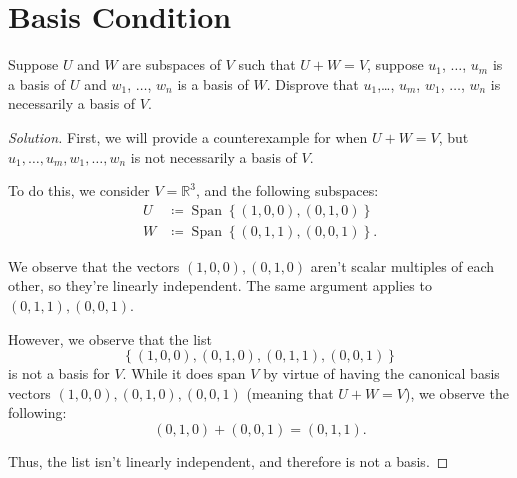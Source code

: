 \documentclass{article}
\newenvironment{solution}{\begin{proof}[Solution]}{\end{proof}}
\newcommand{\RR}{\mathbb{R}}
\DeclareMathOperator*{\Span}{Span}
\begin{document}
	\section{Basis Condition}
	\begin{hw}
		Suppose $U$ and $W$ are subspaces of $V$ such that $U+W=V$, suppose $u_1$, $\ldots$, $u_m$ is a basis of $U$ and $w_1$, $\ldots$, $w_n$ is a basis  of $W$. Disprove that $u_1$,\ldots, $u_m$, $w_1$, $\ldots$, $w_n$ is necessarily a basis of $V$.
	\end{hw}
	\begin{solution}
		First, we will provide a counterexample for when $U + W = V$, but $u_{1}, \ldots, u_{m}, w_{1}, \ldots, w_{n}$ is not necessarily a basis of $V$.
		
		To do this, we consider $V = \RR^{3}$, and the following subspaces:
		\begin{align*}
			U &\coloneq \Span\left\{  (1,0,0), (0,1,0) \right\} \\
			W &\coloneq \Span\left\{  (0,1,1), (0,0,1) \right\}.
		\end{align*}
	
		We observe that the vectors $(1,0,0), (0,1,0)$ aren't scalar multiples of each other, so they're linearly independent. The same argument applies to $(0,1,1), (0,0,1)$.
		
		However, we observe that the list
		\begin{equation*}
			\left\{  (1,0,0), (0,1,0), (0,1,1), (0,0,1) \right\}
		\end{equation*}
		is not a basis for $V$. While it does span $V$ by virtue of having the canonical basis vectors $(1,0,0), (0,1,0), (0,0,1)$ (meaning that $U + W = V$), we observe the following:
		\begin{equation*}
			(0,1,0) + (0,0,1) = (0,1,1).
		\end{equation*}
	
		Thus, the list isn't linearly independent, and therefore is not a basis.
	\end{solution}
\end{document}

